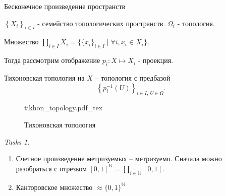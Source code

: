 \documentclass[11pt]{book}
\newcommand{\incfig}[1]{%
    \def\svgwidth{\columnwidth}
    {#1.pdf_tex}
}
\newcommand{\N}{\mathbb{N}}
\theoremstyle{definition}
\theoremstyle{plain}
\theoremstyle{plain}
\theoremstyle{definition}
\theoremstyle{remark}
\newtheorem*{tasks}{Tasks}
\begin{document}
\begin{defn}
    Бесконечное произведение пространств

    $\left \{ X_i \right \}_{i \in  I}$ - семейство топологических пространств. $\Omega_i$ - топология.

    Множество $\prod_{i \in  I} X_i = \{\{x_i\}_{i \in  I}\mid \forall i, x_i \in  X_i \}$.

    Тогда рассмотрим отображение $p_i: X \mapsto X_i$ - проекция.
    
    Тихоновская топология на $X$ -- топология с предбазой
    \[
	\left \{ p^{-1}_i (U) \right \}_{i \in  I, ~ U \in  \Omega}
    .\] 
\begin{figure}[ht]
    \centering
    \incfig{tikhon_topology}
    \caption{Тихоновская топология}
    \label{fig:tikhon_topology}
\end{figure}
\end{defn}
\begin{tasks}
    \begin{enumerate}
	\item Счетное произведение метризуемых -- метризуемо. Сначала можно разобраться с отрезком $[0, 1]^\N = \prod_{i \in  \N} [0, 1]$.
	\item Канторовское множество $\approx \{0, 1\}^\N$
    \end{enumerate}
\end{tasks}
\end{document}
